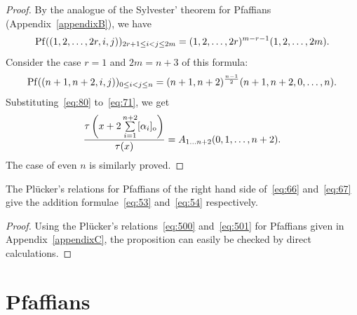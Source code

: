 \documentclass[pdftex]{sigma}
\begin{document}
\begin{proof}
By the analogue of the Sylvester' theorem for Pfaf\/f\/ians (Appendix~\ref{appendixB}), we have
\begin{gather*}%
{\rm Pf}((1,2,\dots,2r,i,j))_{2r+1\le i<j\le2m}=(1,2,\dots,2r)^{m-r-1}(1,2,\dots,2m).
\end{gather*}
Consider the case $r=1$ and $2m=n+3$ of this formula:
\begin{gather}
{\rm Pf}((n+1,n+2,i,j))_{0\le i<j\le n}=(n+1,n+2)^{\frac{n-1}{2}}(n+1,n+2,0,\dots,n).
\label{eq:80}
\end{gather}
Substituting~\eqref{eq:80} to~\eqref{eq:71}, we get
\begin{gather*}%
\frac{\tau\left(x+2\sum\limits_{i=1}^{n+2}[\alpha_i]_{\rm o}\right)}{\tau(x)}=A_{1\dots n+2}(0,1,\dots,n+2).
\end{gather*}
The case of even $n$ is similarly proved.
\end{proof}

\begin{proposition}\label{proposition9}
The Pl\"{u}cker's relations for Pfaffians of the right hand side of~\eqref{eq:66} and~\eqref{eq:67}
give the addition formulae~\eqref{eq:53} and~\eqref{eq:54} respectively.
\end{proposition}

\begin{proof}
Using the Pl\"{u}cker's relations~\eqref{eq:500} and~\eqref{eq:501} for Pfaf\/f\/ians given in Appendix~\ref{appendixC},
the proposition can easily be checked by direct calculations.
\end{proof}

\appendix

\section{Pfaf\/f\/ians} \label{appendixA}
\end{document}
